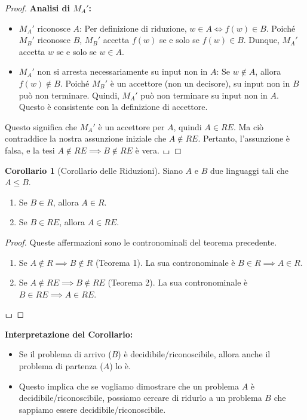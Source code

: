 \documentclass[a4paper]{article}
\newcommand{\blankS}{\ensuremath{\raisebox{-0.15ex}{\scalebox{1.3}[0.7]{$\sqcup$}}}}
\theoremstyle{definition} %
\newtheorem{corollary}[theorem]{Corollario} %
\begin{document}
\begin{proof}
\textbf{Analisi di $M_A'$:}
\begin{itemize}
    \item $M_A'$ riconosce $A$: Per definizione di riduzione, $w \in A \iff f(w) \in B$. Poiché $M_B'$ riconosce $B$, $M_B'$ accetta $f(w)$ se e solo se $f(w) \in B$. Dunque, $M_A'$ accetta $w$ se e solo se $w \in A$.
    \item $M_A'$ non si arresta necessariamente su input non in $A$: Se $w \notin A$, allora $f(w) \notin B$. Poiché $M_B'$ è un accettore (non un decisore), su input non in $B$ può non terminare. Quindi, $M_A'$ può non terminare su input non in $A$. Questo è consistente con la definizione di accettore.
\end{itemize}
Questo significa che $M_A'$ è un accettore per $A$, quindi $A \in RE$.
Ma ciò contraddice la nostra assunzione iniziale che $A \notin RE$.
Pertanto, l'assunzione è falsa, e la tesi $A \notin RE \implies B \notin RE$ è vera.
$\blankS$
\end{proof}

\begin{corollary}[Corollario delle Riduzioni]
Siano $A$ e $B$ due linguaggi tali che $A \le B$.
\begin{enumerate}
    \item Se $B \in R$, allora $A \in R$.
    \item Se $B \in RE$, allora $A \in RE$.
\end{enumerate}
\end{corollary}
\begin{proof}
Queste affermazioni sono le contronominali del teorema precedente.
\begin{enumerate}
    \item Se $A \notin R \implies B \notin R$ (Teorema 1). La sua contronominale è $B \in R \implies A \in R$.
    \item Se $A \notin RE \implies B \notin RE$ (Teorema 2). La sua contronominale è $B \in RE \implies A \in RE$.
\end{enumerate}
$\blankS$
\end{proof}

\textbf{Interpretazione del Corollario:}
\begin{itemize}
    \item Se il problema di arrivo ($B$) è decidibile/riconoscibile, allora anche il problema di partenza ($A$) lo è.
    \item Questo implica che se vogliamo dimostrare che un problema $A$ è decidibile/riconoscibile, possiamo cercare di ridurlo a un problema $B$ che sappiamo essere decidibile/riconoscibile.
\end{itemize}
\end{document}
